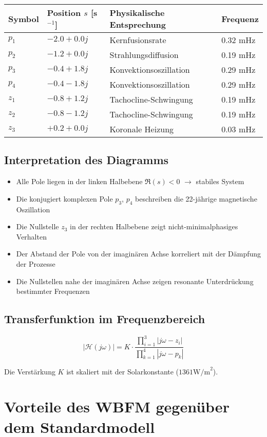 \begin{tabular}{llll}
\hline
Symbol & Position $s$ [s$^{-1}$] & Physikalische Entsprechung & Frequenz \\
\hline
$p_1$ & $-2.0 + 0.0j$ & Kernfusionsrate & 0.32 mHz \\
$p_2$ & $-1.2 + 0.0j$ & Strahlungsdiffusion & 0.19 mHz \\
$p_3$ & $-0.4 + 1.8j$ & Konvektionsoszillation & 0.29 mHz \\
$p_4$ & $-0.4 - 1.8j$ & Konvektionsoszillation & 0.29 mHz \\
$z_1$ & $-0.8 + 1.2j$ & Tachocline-Schwingung & 0.19 mHz \\
$z_2$ & $-0.8 - 1.2j$ & Tachocline-Schwingung & 0.19 mHz \\
$z_3$ & $+0.2 + 0.0j$ & Koronale Heizung & 0.03 mHz \\
\hline
\end{tabular}

\subsection{Interpretation des Diagramms}

\begin{itemize}
\item Alle Pole liegen in der linken Halbebene $\Re(s) < 0$ $\rightarrow$ stabiles System
\item Die konjugiert komplexen Pole $p_3$, $p_4$ beschreiben die 22-jährige magnetische Oszillation
\item Die Nullstelle $z_3$ in der rechten Halbebene zeigt nicht-minimalphasiges Verhalten
\item Der Abstand der Pole von der imaginären Achse korreliert mit der Dämpfung der Prozesse
\item Die Nullstellen nahe der imaginären Achse zeigen resonante Unterdrückung bestimmter Frequenzen
\end{itemize}

\subsection{Transferfunktion im Frequenzbereich}

\[
|\mathcal{H}(j\omega)| = K \cdot \frac{\prod_{i=1}^3 |j\omega - z_i|}{\prod_{k=1}^4 |j\omega - p_k|}
\]

Die Verstärkung $K$ ist skaliert mit der Solarkonstante ($1361  \text{W/m}^2$).

\section{Vorteile des WBFM gegenüber dem Standardmodell}

